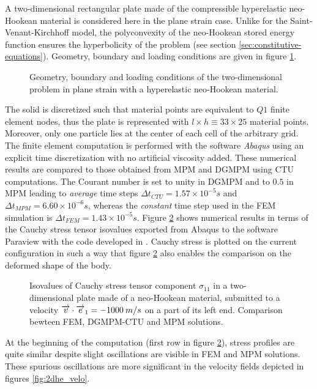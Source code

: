A two-dimensional rectangular plate made of the compressible hyperelastic neo-Hookean material is considered here in the plane strain case. Unlike for the Saint-Venant-Kirchhoff model, the polyconvexity of the neo-Hookean stored energy function ensures the hyperbolicity of the problem (see section \ref{sec:constitutive-equations}).
Geometry, boundary and loading conditions are given in figure \ref{fig:2d_heDomain}.
\begin{figure}[h!]
  \centering
  
  \caption{Geometry, boundary and loading conditions of the two-dimensional problem in plane strain with a hyperelastic neo-Hookean material.}
  \label{fig:2d_heDomain}
\end{figure}

The solid is discretized such that material points are equivalent to $Q1$ finite element nodes, thus the plate is represented with $l \times h \equiv 33 \times 25$ material points. Moreover, only one particle lies at the center of each cell of the arbitrary grid. The finite element computation is performed with the software \textit{Abaqus} \cite{Abaqus} using an explicit time discretization with no artificial viscosity added. These numerical results are compared to those obtained from MPM and DGMPM using CTU computations. The Courant number is set to unity in DGMPM and to $0.5$ in MPM leading to \textit{average} time steps $\Delta t_{CTU}=1.57 \times 10^{-5}s$ and $\Delta t_{MPM}=6.60 \times 10^{-6}s$, whereas the \textit{constant} time step used in the FEM simulation is $\Delta t_ {FEM}=1.43 \times 10^{-5} s$. Figure \ref{fig:2dhe_stress} shows numerical results in terms of the Cauchy stress tensor isovalues exported from Abaqus to the software Paraview \cite{Paraview} with the code developed in \cite{Export_Abaqus}. Cauchy stress is plotted on the current configuration in such a way that figure \ref{fig:2dhe_stress} also enables the comparison on the deformed shape of the body.
\begin{figure}[h!]
  \centering
  
  \caption{Isovalues of Cauchy stress tensor component $\sigma_{11}$ in a two-dimensional plate made of a neo-Hookean material, submitted to a velocity ${\overrightarrow{v}}\cdot{\overrightarrow{e}}_1=-1000 \: m/s$ on a part of its left end. Comparison bewteen FEM, DGMPM-CTU and MPM solutions.}
  \label{fig:2dhe_stress}
\end{figure}
At the beginning of the computation (first row in figure \ref{fig:2dhe_stress}), stress profiles are quite similar despite slight oscillations are visible in FEM and MPM solutions. These spurious oscillations are more significant in the velocity fields depicted in figures \ref{fig:2dhe_velo}.
